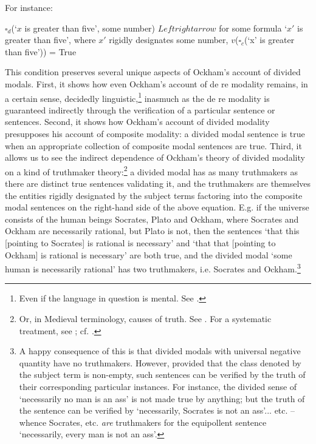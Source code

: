\documentclass[a4paper]{article}
\begin{document}
For instance:

$\square_{d}$(`$x$ is greater than five', some number) $Leftrightarrow$ for some formula `$x'$ is greater than five', where $x'$ rigidly designates some number, $v$($\square_{c}$(`x' is greater than five')) = True

This condition preserves several unique aspects of Ockham's account of divided modals. First, it shows how even Ockham's account of de re modality remains, in a certain sense, decidedly linguistic,\footnote{Even if the language in question is mental. See \cite{Panaccio1999}.}  inasmuch as the de re modality is guaranteed indirectly through the verification of a particular sentence or sentences. Second, it shows how Ockham's account of divided modality presupposes his account of composite modality: a divided modal sentence is true when an appropriate collection of composite modal sentences are true. Third, it allows us to see the indirect dependence of Ockham's theory of divided modality on a kind of truthmaker theory:\footnote{Or, in Medieval terminology, causes of truth. See \cite[II. 22, p. 293]{OckhamSL2}. For a systematic treatment, see \cite[I. 2]{BuridanTC}; cf. \cite[pp. 9-10]{Read2015}.}  a divided modal has as many truthmakers as there are distinct true sentences validating it, and the truthmakers are themselves the entities rigidly designated by the subject terms factoring into the composite modal sentences on the right-hand side of the above equation. E.g. if the universe consists of the human beings Socrates, Plato and Ockham, where Socrates and Ockham are necessarily rational, but Plato is not, then the sentences `that this [pointing to Socrates] is rational is necessary' and `that that [pointing to Ockham] is rational is necessary' are both true, and the divided modal `some human is necessarily rational' has two truthmakers, i.e. Socrates and Ockham.\footnote{A happy consequence of this is that divided modals with universal negative quantity have no truthmakers. However, provided that the class denoted by the subject term is non-empty, such sentences can be verified by the truth of their corresponding particular instances. For instance, the divided sense of `necessarily no man is an ass' is not made true by anything; but the truth of the sentence can be verified by `necessarily, Socrates is not an ass'... etc. – whence Socrates, etc. \textit{are} truthmakers for the equipollent sentence `necessarily, every man is not an ass'.}
\end{document}
